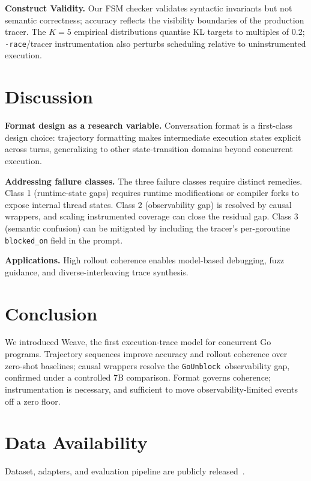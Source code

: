 \documentclass[10pt,conference]{IEEEtran}
\newcommand{\eunblock}{\texttt{GoUnblock}}
\begin{document}
\textbf{Construct Validity.} Our FSM checker validates syntactic invariants but not semantic correctness; accuracy reflects the visibility boundaries of the production tracer. The $K{=}5$ empirical distributions quantise KL targets to multiples of 0.2; \texttt{-race}/tracer instrumentation also perturbs scheduling relative to uninstrumented execution.

\section{Discussion}\label{sec:discussion}

\textbf{Format design as a research variable.} Conversation format is a first-class design choice: trajectory formatting makes intermediate execution states explicit across turns, generalizing to other state-transition domains beyond concurrent execution.

\textbf{Addressing failure classes.} The three failure classes require distinct remedies. Class 1 (runtime-state gaps) requires runtime modifications or compiler forks to expose internal thread states. Class 2 (observability gap) is resolved by causal wrappers, and scaling instrumented coverage can close the residual gap. Class 3 (semantic confusion) can be mitigated by including the tracer's per-goroutine \texttt{blocked\_on} field in the prompt.

\textbf{Applications.} High rollout coherence enables model-based debugging, fuzz guidance, and diverse-interleaving trace synthesis.

\section{Conclusion}\label{sec:conclusion}

We introduced Weave, the first execution-trace model for concurrent Go programs. Trajectory sequences improve accuracy and rollout coherence over zero-shot baselines; causal wrappers resolve the \eunblock\ observability gap, confirmed under a controlled 7B comparison. Format governs coherence; instrumentation is necessary, and sufficient to move observability-limited events off a zero floor.

\section*{Data Availability}
Dataset, adapters, and evaluation pipeline are publicly released~\cite{anon-artifacts}.



\end{document}
